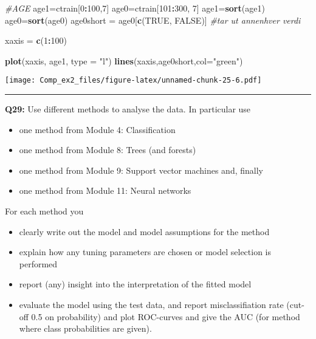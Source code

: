 \documentclass[]{article}
\newenvironment{Shaded}{\begin{snugshade}}{\end{snugshade}}
\newcommand{\KeywordTok}[1]{\textcolor[rgb]{0.13,0.29,0.53}{\textbf{#1}}}
\newcommand{\DataTypeTok}[1]{\textcolor[rgb]{0.13,0.29,0.53}{#1}}
\newcommand{\DecValTok}[1]{\textcolor[rgb]{0.00,0.00,0.81}{#1}}
\newcommand{\StringTok}[1]{\textcolor[rgb]{0.31,0.60,0.02}{#1}}
\newcommand{\CommentTok}[1]{\textcolor[rgb]{0.56,0.35,0.01}{\textit{#1}}}
\newcommand{\OtherTok}[1]{\textcolor[rgb]{0.56,0.35,0.01}{#1}}
\newcommand{\OperatorTok}[1]{\textcolor[rgb]{0.81,0.36,0.00}{\textbf{#1}}}
\newcommand{\NormalTok}[1]{#1}
\providecommand{\tightlist}{%
  \setlength{\itemsep}{0pt}\setlength{\parskip}{0pt}}
\begin{document}
\begin{Shaded}
\begin{Highlighting}[]
\CommentTok{#AGE }
\NormalTok{age1=ctrain[}\DecValTok{0}\OperatorTok{:}\DecValTok{100}\NormalTok{,}\DecValTok{7}\NormalTok{]}
\NormalTok{age0=ctrain[}\DecValTok{101}\OperatorTok{:}\DecValTok{300}\NormalTok{, }\DecValTok{7}\NormalTok{]}
\NormalTok{age1=}\KeywordTok{sort}\NormalTok{(age1)}
\NormalTok{age0=}\KeywordTok{sort}\NormalTok{(age0)}
\NormalTok{age0short =}\StringTok{ }\NormalTok{age0[}\KeywordTok{c}\NormalTok{(}\OtherTok{TRUE}\NormalTok{, }\OtherTok{FALSE}\NormalTok{)] }\CommentTok{#tar ut annenhver verdi }

\NormalTok{xaxis =}\StringTok{ }\KeywordTok{c}\NormalTok{(}\DecValTok{1}\OperatorTok{:}\DecValTok{100}\NormalTok{)}

\KeywordTok{plot}\NormalTok{(xaxis, age1, }\DataTypeTok{type =} \StringTok{"l"}\NormalTok{)}
\KeywordTok{lines}\NormalTok{(xaxis,age0short,}\DataTypeTok{col=}\StringTok{"green"}\NormalTok{)}
\end{Highlighting}
\end{Shaded}

\texttt{[image: Comp\_ex2\_files/figure-latex/unnamed-chunk-25-6.pdf]}

\begin{center}\rule{0.5\linewidth}{\linethickness}\end{center}

\textbf{Q29:} Use different methods to analyse the data. In particular
use

\begin{itemize}
\tightlist
\item
  one method from Module 4: Classification
\item
  one method from Module 8: Trees (and forests)
\item
  one method from Module 9: Support vector machines and, finally
\item
  one method from Module 11: Neural networks
\end{itemize}

For each method you

\begin{itemize}
\tightlist
\item
  clearly write out the model and model assumptions for the method
\item
  explain how any tuning parameters are chosen or model selection is
  performed
\item
  report (any) insight into the interpretation of the fitted model
\item
  evaluate the model using the test data, and report misclassifiation
  rate (cut-off 0.5 on probability) and plot ROC-curves and give the AUC
  (for method where class probabilities are given).
\end{itemize}
\end{document}
